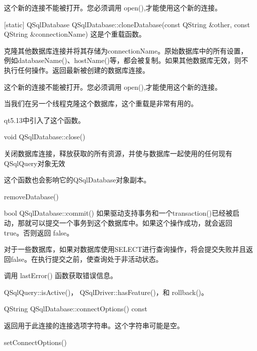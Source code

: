 \begin{notice}[警告]
这个新的连接不能被打开。您必须调用 open(),才能使用这个新的连接。
\end{notice}


[static] QSqlDatabase QSqlDatabase::cloneDatabase(const QString \&other, const QString \&connectionName)
这是个重载函数。

克隆其他数据库连接并将其存储为connectionName。原始数据库中的所有设置，例如databaseName()、hostName()等，都会被复制。如果其他数据库无效，则不执行任何操作。返回最新被创建的数据库连接。



\begin{notice}
这个新的连接不能被打开。您必须调用 open(),才能使用这个新的连接。
\end{notice}

当我们在另一个线程克隆这个数据库，这个重载是非常有用的。

qt5.13中引入了这个函数。

void QSqlDatabase::close()

关闭数据库连接，释放获取的所有资源，并使与数据库一起使用的任何现有QSqlQuery对象无效

这个函数也会影响它的QSqlDatabase对象副本。




\begin{seeAlso}
removeDatabase()
\end{seeAlso}


bool QSqlDatabase::commit()
如果驱动支持事务和一个transaction()已经被启动，那就可以提交一个事务到这个数据库中。如果这个操作成功，就会返回 true。否则返回 false。


\begin{notice}
对于一些数据库，如果对数据库使用SELECT进行查询操作，将会提交失败并且返回false。在执行提交之前，使查询处于非活动状态。
\end{notice} 

调用 lastError() 函数获取错误信息。

\begin{seeAlso}
 QSqlQuery::isActive()， QSqlDriver::hasFeature()，和 rollback()。
\end{seeAlso}


QString QSqlDatabase::connectOptions() const

返回用于此连接的连接选项字符串。这个字符串可能是空。


\begin{seeAlso}
setConnectOptions()
\end{seeAlso}

